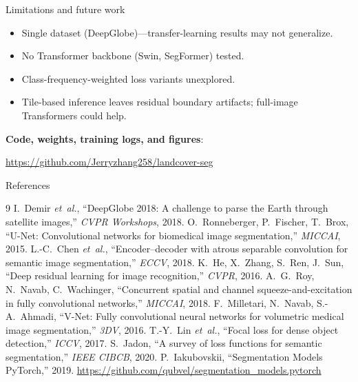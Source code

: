 \documentclass[aspectratio=169,12pt,xcolor={table}]{beamer}
\begin{document}
\begin{frame}{Limitations and future work}
  \begin{itemize}
    \item Single dataset (DeepGlobe)---transfer-learning results may not
          generalize.
    \item No Transformer backbone (Swin, SegFormer) tested.
    \item Class-frequency-weighted loss variants unexplored.
    \item Tile-based inference leaves residual boundary artifacts;
          full-image Transformers could help.
  \end{itemize}

  \vspace{0.8em}
  \textbf{Code, weights, training logs, and figures}:
  \centerline{\small \url{https://github.com/Jerryzhang258/landcover-seg}}
\end{frame}

\begin{frame}{References}
  \scriptsize
  \begin{thebibliography}{9}
    \setlength{\itemsep}{0.1em}
    \setlength{\parsep}{0pt}
      I.~Demir \emph{et~al.}, ``DeepGlobe 2018: A challenge to parse
      the Earth through satellite images,'' \emph{CVPR Workshops}, 2018.
      O.~Ronneberger, P.~Fischer, T.~Brox,
      ``U-Net: Convolutional networks for biomedical image
      segmentation,'' \emph{MICCAI}, 2015.
      L.-C.~Chen \emph{et~al.}, ``Encoder--decoder with atrous separable
      convolution for semantic image segmentation,'' \emph{ECCV}, 2018.
      K.~He, X.~Zhang, S.~Ren, J.~Sun,
      ``Deep residual learning for image recognition,''
      \emph{CVPR}, 2016.
      A.~G.~Roy, N.~Navab, C.~Wachinger,
      ``Concurrent spatial and channel squeeze-and-excitation in fully
      convolutional networks,'' \emph{MICCAI}, 2018.
      F.~Milletari, N.~Navab, S.-A.~Ahmadi,
      ``V-Net: Fully convolutional neural networks for volumetric
      medical image segmentation,'' \emph{3DV}, 2016.
      T.-Y.~Lin \emph{et~al.}, ``Focal loss for dense object detection,''
      \emph{ICCV}, 2017.
      S.~Jadon, ``A survey of loss functions for semantic
      segmentation,'' \emph{IEEE CIBCB}, 2020.
      P.~Iakubovskii, ``Segmentation Models PyTorch,'' 2019.
      \url{https://github.com/qubvel/segmentation_models.pytorch}
  \end{thebibliography}
\end{frame}
\end{document}
